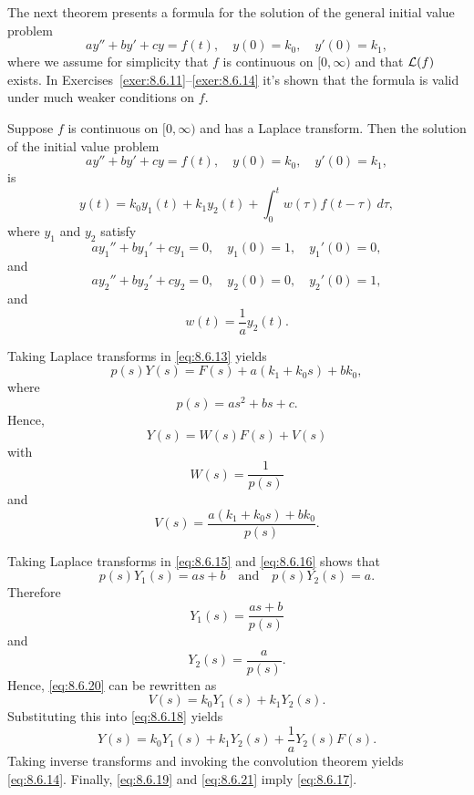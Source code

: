 
\noindent
The next theorem presents a formula for the solution of the general initial value problem
\[
  ay''+by'+cy=f(t),\quad y(0)=k_{0},\quad y'(0)=k_{1},
\]
where we assume for simplicity that $f$ is continuous on $[0,\infty)$ and that ${\cal L}(f)$ exists.
In Exercises~\ref{exer:8.6.11}--\ref{exer:8.6.14} it's shown that the formula is valid under much
weaker conditions on $f$.

\begin{theorem}
  \color{blue}
  \label{thmtype:8.6.3} Suppose $f$ is continuous on $[0,\infty)$ and has a Laplace transform. Then
  the solution of the initial value problem
  \begin{equation}
    \label{eq:8.6.13}ay''+by'+cy=f(t),\quad y(0)=k_{0},\quad y'(0)=k_{1},
  \end{equation}
  is
  \begin{equation}
    \label{eq:8.6.14}y(t)=k_{0}y_{1}(t)+k_{1}y_{2}(t)+\int_{0}^{t}w(\tau)f(t-\tau)\,d\tau,
  \end{equation}
  where $y_{1}$ and $y_{2}$ satisfy
  \begin{equation}
    \label{eq:8.6.15}ay_{1}''+by_{1}'+cy_{1}=0,\quad y_{1}(0)=1,\quad y_{1}'(0)=0,
  \end{equation}
  and
  \begin{equation}
    \label{eq:8.6.16}ay_{2}''+by_{2}'+cy_{2}=0,\quad y_{2}(0)=0,\quad y_{2}'(0)=1,
  \end{equation}
  and
  \begin{equation}
    \label{eq:8.6.17}w(t)=\frac{1}{a}y_{2}(t).
  \end{equation}
\end{theorem}

\proof Taking Laplace transforms in \eqref{eq:8.6.13} yields
\[
  p(s)Y(s)=F(s)+a(k_{1}+k_{0}s)+bk_{0},
\]
where
\[
  p(s)=as^{2}+bs+c.
\]
Hence,
\begin{equation}
  \label{eq:8.6.18}Y(s)=W(s)F(s)+V(s)
\end{equation}
with
\begin{equation}
  \label{eq:8.6.19}W(s)=\frac{1}{p(s)}
\end{equation}
and
\begin{equation}
  \label{eq:8.6.20}V(s)=\frac{a(k_{1}+k_{0}s)+bk_{0}}{p(s)}.
\end{equation}

Taking Laplace transforms in \eqref{eq:8.6.15} and \eqref{eq:8.6.16} shows that
\[
  p(s)Y_{1}(s)=as+b\quad\mbox{and}\quad p(s)Y_{2}(s)=a.
\]
Therefore
\[
  Y_{1}(s)=\frac{as+b}{p(s)}
\]
and
\begin{equation}
  \label{eq:8.6.21}Y_{2}(s)=\frac{a}{p(s)}.
\end{equation}
Hence, \eqref{eq:8.6.20} can be rewritten as
\[
  V(s)=k_{0}Y_{1}(s)+k_{1}Y_{2}(s).
\]
Substituting this into \eqref{eq:8.6.18} yields
\[
  Y(s)=k_{0}Y_{1}(s)+k_{1}Y_{2}(s)+\frac{1}{a}Y_{2}(s)F(s).
\]
Taking inverse transforms and invoking the convolution theorem yields \eqref{eq:8.6.14}. Finally,
\eqref{eq:8.6.19} and \eqref{eq:8.6.21} imply \eqref{eq:8.6.17}.\bbox

